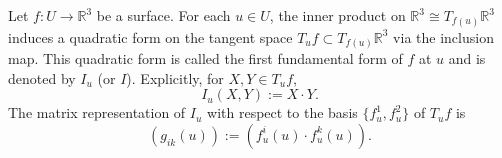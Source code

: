 Let $f: U \to \mathbb{R}^3$ be a surface. For each $u \in U$, the inner product on $\mathbb{R}^3 \cong T_{f(u)} \mathbb{R}^3$ induces a quadratic form on the tangent space $T_u f \subset T_{f(u)} \mathbb{R}^3$ via the inclusion map. This quadratic form is called the first fundamental form of $f$ at $u$ and is denoted by $I_u$ (or $I$). Explicitly, for $X, Y \in T_u f$,
$$I_u(X, Y) := X \cdot Y.$$
The matrix representation of $I_u$ with respect to the basis $\{f_u^1, f_u^2\}$ of $T_u f$ is
$$(g_{ik}(u)) := (f_u^i(u) \cdot f_u^k(u)).$$
